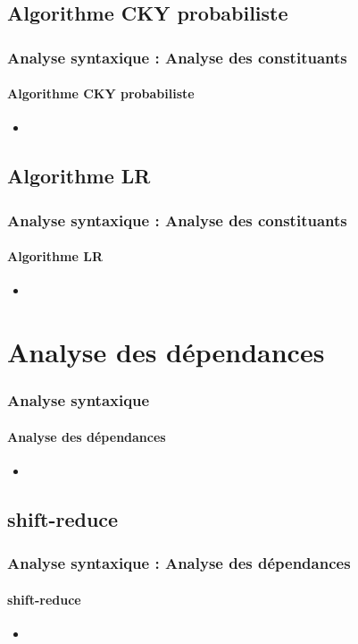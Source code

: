 \documentclass[xcolor=table]{beamer}
\begin{document}
\subsection{Algorithme CKY probabiliste}

\begin{frame}
\frametitle{Analyse syntaxique : Analyse des constituants}
\framesubtitle{Algorithme CKY probabiliste}

\begin{itemize}
	\item 
\end{itemize}

\end{frame}

\subsection{Algorithme LR}

\begin{frame}
\frametitle{Analyse syntaxique : Analyse des constituants}
\framesubtitle{Algorithme LR}

\begin{itemize}
	\item 
\end{itemize}

\end{frame}

\section{Analyse des dépendances}

\begin{frame}
\frametitle{Analyse syntaxique}
\framesubtitle{Analyse des dépendances}

\begin{itemize}
	\item 
\end{itemize}

\end{frame}

\subsection{shift-reduce}

\begin{frame}
\frametitle{Analyse syntaxique : Analyse des dépendances}
\framesubtitle{shift-reduce}

\begin{itemize}
	\item 
\end{itemize}

\end{frame}
\end{document}
